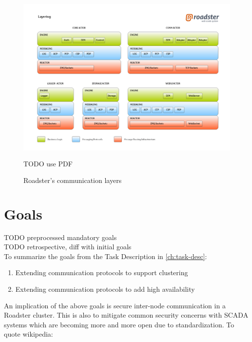 \begin{figure}[!ht]
	\includegraphics[trim=2cm 2.5cm 1cm 2.8cm, clip=true, width=\textwidth]{img/roadster_layering.png}
	\caption{Roadster's communication layers}
	\label{fig:roadster:layers}
TODO use PDF
\end{figure}

\section{Goals}
TODO preprocessed mandatory goals\\
TODO retrospective, diff with initial goals\\

To summarize the goals from the Task Description in \autoref{ch:task-desc}:

\begin{enumerate}
	\item Extending communication protocols to support clustering
	\item Extending communication protocols to add high availability
\end{enumerate}

An implication of the above goals is secure inter-node communication in a Roadster cluster. This is also to mitigate common security concerns with SCADA systems which are becoming more and more open due to standardization. To quote wikipedia:

